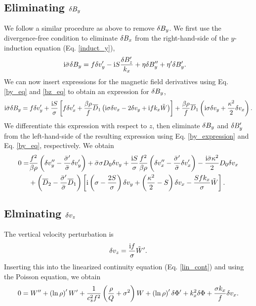 \subsection{Eliminating $\delta B_y$}
We follow a similar procedure as above to remove $\delta B_y$. We first use
the divergence-free condition to eliminate $\delta B_x$ from the
right-hand-side of the $y$-induction equation (Eq. \ref{induct_y}),
\begin{align}
  &\mathrm{i}\bar{\sigma}\delta B_y = f\delta v_y^\prime - \mathrm{i}
  S\frac{\delta B_z^\prime}{k_x} +
  \eta\delta B_y^{\prime\prime}+\eta^\prime\delta B_y^\prime.  
\end{align}
We can now insert expressions for the magnetic field derivatives using
Eq. \ref{by_eq} and \ref{bz_eq} to obtain an expression for $\delta B_y$, 
\begin{align}
  \mathrm{i}\bar{\sigma}\delta B_y = f \delta v_y^\prime + \frac{\mathrm{i} S}{\sigma}\left[
    f\delta v_x^\prime + \frac{\beta\rho}{f}\overline{D}_1\left(\mathrm{i}\sigma\delta v_x -
  2\delta v_y + \mathrm{i} f k_x\tilde{W} \right)\right] +
  \frac{\beta\rho}{f}\overline{D}_1\left(\mathrm{i}\sigma\delta v_y +
  \frac{\kappa^2}{2}\delta v_x\right). \label{by_expression}
\end{align}
We differentiate this expression with respect to $z$, then eliminate 
$\delta B_y$ and  $\delta B_y^\prime$ from the left-hand-side of the resulting
expression using Eq. \ref{by_expression} and 
Eq. \ref{by_eq}, respectively. We obtain
\begin{align}
  0 =& \frac{f^2}{\beta\rho}\left(\delta v_y^{\prime\prime} -
  \frac{\bar{\sigma}^\prime}{\bar{\sigma}}\delta v_y^\prime\right) 
  + \bar{\sigma}\sigma D_0\delta v_y  + \frac{\mathrm{i} 
    S}{\sigma}\frac{f^2}{\beta\rho}\left(\delta v_x^{\prime\prime} -
    \frac{\bar{\sigma}^\prime}{\bar{\sigma}}\delta v_x^\prime\right) -
    \frac{\mathrm{i}\bar{\sigma}\kappa^2}{2}D_0\delta v_x \notag\\
    & + \left(\overline{D}_2 -
    \frac{\bar{\sigma}^\prime}{\bar{\sigma}}\overline{D}_1\right)\left[\mathrm{i}\left(\sigma
      - \frac{2S}{\sigma}\right)\delta v_y + \left(\frac{\kappa^2}{2} -
      S\right)\delta v_x - \frac{Sfk_x}{\sigma}\tilde{W}\right]. \label{final_vy}
\end{align}

\subsection{Elminating $\delta v_z$}
The vertical velocity perturbation is
\begin{align}
  \delta v_z = \frac{\mathrm{i} f}{\sigma}\tilde{W}^\prime. 
\end{align}
Inserting this into the linearized continuity equation
(Eq. \ref{lin_cont}) and using the Poisson equation, we obtain
\begin{align}
0=  W^{\prime\prime} + \left(\ln{\rho}\right)^\prime W^\prime +
  \frac{1}{c_s^2f^2}\left(\frac{\rho}{Q} + \sigma^2\right)W +
  \left(\ln{\rho}\right)^\prime\delta \Phi^\prime + k_x^2\delta \Phi + \frac{\sigma
  k_x}{f}\delta v_x.\label{final_w}
\end{align}
